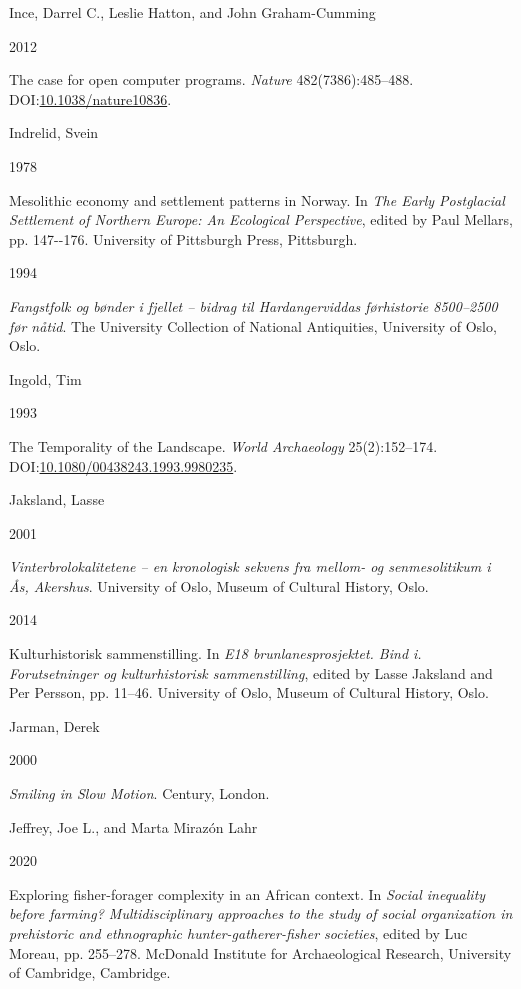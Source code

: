\documentclass[
  12pt,
  a4paper,
  oneside]{book}
\newlength{\cslhangindent}
\newlength{\csllabelwidth}
\newlength{\cslentryspacingunit} %
\newenvironment{CSLReferences}[2] %
 {%
  \setlength{\parindent}{0pt}
  \ifodd #1
  \let\oldpar\par
  \def\par{\hangindent=\cslhangindent\oldpar}
  \fi
  \setlength{\parskip}{#2\cslentryspacingunit}
 }%
 {}
\newcommand{\CSLBlock}[1]{#1\hfill\break}
\newcommand{\CSLLeftMargin}[1]{\parbox[t]{\csllabelwidth}{#1}}
\newcommand{\CSLRightInline}[1]{\parbox[t]{\linewidth - \csllabelwidth}{#1}\break}
\begin{document}
\begin{CSLReferences}{0}{0}
\leavevmode{}%
\CSLBlock{Ince, Darrel C., Leslie Hatton, and John Graham-Cumming}
\CSLLeftMargin{ 2012}%
\CSLRightInline{{The case for open computer programs}. \emph{Nature} 482(7386):485--488. DOI:\href{https://doi.org/10.1038/nature10836}{10.1038/nature10836}.}

\leavevmode{}%
\CSLBlock{Indrelid, Svein}
\CSLLeftMargin{ 1978}%
\CSLRightInline{{Mesolithic economy and settlement patterns in Norway}. In \emph{{The Early Postglacial Settlement of Northern Europe: An Ecological Perspective}}, edited by Paul Mellars, pp. 147-\/-176. University of Pittsburgh Press, Pittsburgh.}

\leavevmode{}%
\CSLLeftMargin{ 1994 }%
\CSLRightInline{\emph{{Fangstfolk og bønder i fjellet -- bidrag til Hardangerviddas førhistorie 8500--2500 før nåtid}}. The University Collection of National Antiquities, University of Oslo, Oslo.}

\leavevmode{}%
\CSLBlock{Ingold, Tim}
\CSLLeftMargin{ 1993}%
\CSLRightInline{{The Temporality of the Landscape}. \emph{World Archaeology} 25(2):152--174. DOI:\href{https://doi.org/10.1080/00438243.1993.9980235}{10.1080/00438243.1993.9980235}.}

\leavevmode{}%
\CSLBlock{Jaksland, Lasse}
\CSLLeftMargin{ 2001}%
\CSLRightInline{\emph{{Vinterbrolokalitetene -- en kronologisk sekvens fra mellom- og senmesolitikum i Ås, Akershus}}. University of Oslo, Museum of Cultural History, Oslo.}

\leavevmode{}%
\CSLLeftMargin{ 2014 }%
\CSLRightInline{Kulturhistorisk sammenstilling. In \emph{E18 brunlanesprosjektet. Bind i. Forutsetninger og kulturhistorisk sammenstilling}, edited by Lasse Jaksland and Per Persson, pp. 11--46. University of Oslo, Museum of Cultural History, Oslo.}

\leavevmode{}%
\CSLBlock{Jarman, Derek}
\CSLLeftMargin{ 2000}%
\CSLRightInline{\emph{{Smiling in Slow Motion}}. Century, London.}

\leavevmode{}%
\CSLBlock{Jeffrey, Joe L., and Marta Mirazón Lahr}
\CSLLeftMargin{ 2020}%
\CSLRightInline{{Exploring fisher-forager complexity in an African context}. In \emph{{Social inequality before farming? Multidisciplinary approaches to the study of social organization in prehistoric and ethnographic hunter-gatherer-fisher societies}}, edited by Luc Moreau, pp. 255--278. McDonald Institute for Archaeological Research, University of Cambridge, Cambridge.}


\end{CSLReferences}
\end{document}
